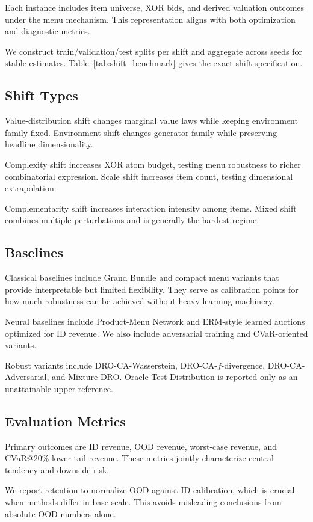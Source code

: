 \documentclass{article}
\begin{document}
Each instance includes item universe, XOR bids, and derived valuation outcomes under the menu mechanism. This representation aligns with both optimization and diagnostic metrics.

We construct train/validation/test splits per shift and aggregate across seeds for stable estimates. Table~\ref{tab:shift_benchmark} gives the exact shift specification.

\subsection{Shift Types}
Value-distribution shift changes marginal value laws while keeping environment family fixed. Environment shift changes generator family while preserving headline dimensionality.

Complexity shift increases XOR atom budget, testing menu robustness to richer combinatorial expression. Scale shift increases item count, testing dimensional extrapolation.

Complementarity shift increases interaction intensity among items. Mixed shift combines multiple perturbations and is generally the hardest regime.

\subsection{Baselines}
Classical baselines include Grand Bundle and compact menu variants that provide interpretable but limited flexibility. They serve as calibration points for how much robustness can be achieved without heavy learning machinery.

Neural baselines include Product-Menu Network and ERM-style learned auctions optimized for ID revenue. We also include adversarial training and CVaR-oriented variants.

Robust variants include DRO-CA-Wasserstein, DRO-CA-$f$-divergence, DRO-CA-Adversarial, and Mixture DRO. Oracle Test Distribution is reported only as an unattainable upper reference.

\subsection{Evaluation Metrics}
Primary outcomes are ID revenue, OOD revenue, worst-case revenue, and CVaR@20\% lower-tail revenue. These metrics jointly characterize central tendency and downside risk.

We report retention to normalize OOD against ID calibration, which is crucial when methods differ in base scale. This avoids misleading conclusions from absolute OOD numbers alone.
\end{document}
